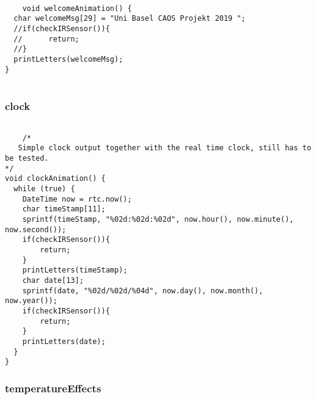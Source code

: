\documentclass[12pt,a4paper]{article}
\begin{document}
\begin{lstlisting}[language=Arduino]

    void welcomeAnimation() {
  char welcomeMsg[29] = "Uni Basel CAOS Projekt 2019 ";
  //if(checkIRSensor()){
  //      return;
  //}
  printLetters(welcomeMsg);
}
    
\end{lstlisting}

\subsubsection{clock}

\begin{lstlisting}[language=Arduino]

    /*
   Simple clock output together with the real time clock, still has to be tested.
*/
void clockAnimation() {
  while (true) {
    DateTime now = rtc.now();
    char timeStamp[11];
    sprintf(timeStamp, "%02d:%02d:%02d", now.hour(), now.minute(), now.second());
    if(checkIRSensor()){
        return;
    }
    printLetters(timeStamp);
    char date[13];
    sprintf(date, "%02d/%02d/%04d", now.day(), now.month(), now.year());
    if(checkIRSensor()){
        return;
    }
    printLetters(date);
  }
}

\end{lstlisting}

\subsubsection{temperatureEffects}
\end{document}

